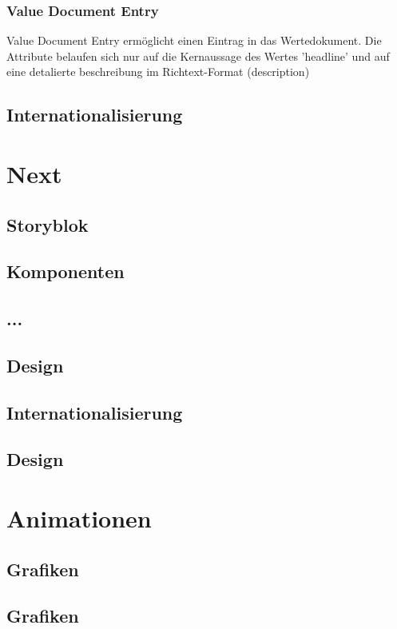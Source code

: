 \subsubsection*{Value Document Entry}
Value Document Entry ermöglicht einen Eintrag in das Wertedokument. Die Attribute belaufen sich nur auf die Kernaussage des Wertes 'headline' und auf eine detalierte beschreibung im Richtext-Format (description) 

\subsection{Internationalisierung}

\section{Next}

\subsection{Storyblok}

\subsection{Komponenten}

\subsection{...}

\subsection{Design}

\subsection{Internationalisierung}

\subsection{Design}



\section{Animationen}

\subsection{Grafiken}

\subsection{Grafiken}

